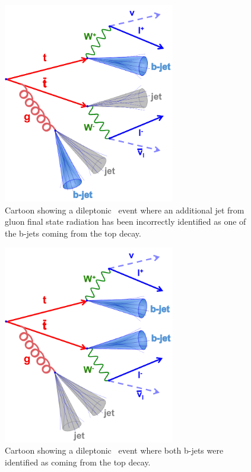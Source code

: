\begin{figure}[htbp!]
     \begin{center}
     \includegraphics[width=75mm]{f/top_gluon_emission}
     \end{center}
     \caption{Cartoon showing a dileptonic \ttbar\ event where an additional jet from gluon final state radiation has been incorrectly identified as one of the b-jets coming from the top decay.}
     \label{fig:dilepton_cartoon}
    \end{figure}

\begin{figure}[htbp!]
     \begin{center}
     \includegraphics[width=75mm]{f/top_gluon_emission_2}
     \end{center}
     \caption{Cartoon showing a dileptonic \ttbar\ event where both b-jets were identified as coming from the top decay.}
     \label{fig:dilepton_cartoon2}
    \end{figure}

